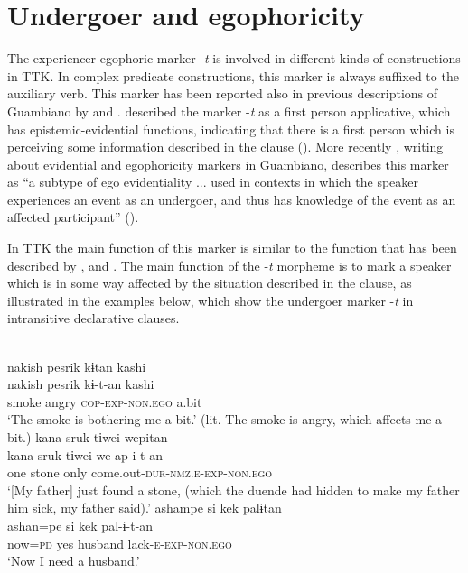\documentclass[output=paper]{langsci/langscibook}
\begin{document}
\section{Undergoer and egophoricity}\label{s:gg5}

The experiencer egophoric marker -\textit{t} is involved in different kinds of constructions in TTK. In complex predicate constructions, this marker is always suffixed to the auxiliary verb. This marker has been reported also in previous descriptions of Guambiano by \citet[101]{Vasquez2007} and \citet[615]{TrivinoGarzon1994}. \citet{Vasquez2007} described the marker -\textit{t} as a first person applicative, which has epistemic-evidential functions, indicating that there is a first person which is perceiving some information described in the clause (\citealt[101]{Vasquez2007}). 
More recently \citet{Norcliffe2018}, writing about evidential and egophoricity markers in Guambiano, describes this marker as “a subtype of ego evidentiality ... used in contexts in which the speaker experiences an event as an undergoer, and thus has knowledge of the event as an affected participant” (\citeyear[25]{Norcliffe2018}).

In TTK the main function of this marker is similar to the function that has been described by \citet{Vasquez2007}, \citet{TrivinoGarzon1994} and \citet{Norcliffe2018}. The main function of the -\textit{t} morpheme is to mark a speaker which is in some way affected by the situation described in the clause, as illustrated in the examples below, which show the undergoer marker -\textit{t}  in intransitive declarative clauses. 

\newpage
\ea
{}\\ 
	\ea \label{ex:gg65a}
    \glll nakish pesrik	kɨtan kashi\\
    nakish	pesrik	kɨ-t-an	kashi\\
         smoke	angry \textsc{cop-exp-non.ego} a.bit\\
    \glt ‘The smoke is bothering me a bit.’ (lit. The smoke is angry, which affects me a bit.)
  \ex \label{ex:gg65b}
    \glll kana sruk tɨwei wepitan\\
    kana	sruk	tɨwei	we-ap-i-t-an\\
   	one	stone only come.out-\textsc{dur-nmz.e-exp-non.ego}\\    
   	\glt ‘[My father] just found a stone, (which the duende had hidden to make my father him sick, my father said).’
   \ex \label{ex:gg65c}
   \glll ashampe si	kek	palɨtan\\
   ashan=pe	si	kek	pal-ɨ-t-an\\
   now=\textsc{pd} yes	husband	lack-\textsc{e-exp-non.ego}\\
   \glt `Now I need a husband.'
\z \z
\end{document}

